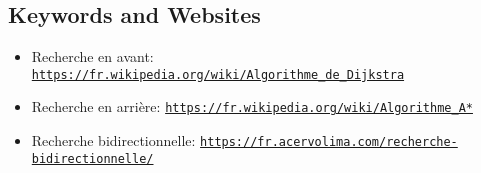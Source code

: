\documentclass[a4paper,11pt]{report}
\newcommand{\BrochureUrlText}[1]{\texttt{#1}}
\begin{document}
{\raggedright

\subsection*{Keywords and Websites}

\begin{itemize}
  \item Recherche en avant: \href{https://fr.wikipedia.org/wiki/Algorithme_de_Dijkstra}{\BrochureUrlText{https://fr.wikipedia.org/wiki/Algorithme\_de\_Dijkstra}}
  \item Recherche en arrière: \href{https://fr.wikipedia.org/wiki/Algorithme_A*}{\BrochureUrlText{https://fr.wikipedia.org/wiki/Algorithme\_A*}}
  \item Recherche bidirectionnelle: \href{https://fr.acervolima.com/recherche-bidirectionnelle/}{\BrochureUrlText{https://fr.acervolima.com/recherche-bidirectionnelle/}}
\end{itemize}


}
\end{document}
